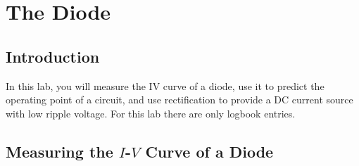 \chapter{The Diode}

%

\section{Introduction}

In this lab, you will measure the IV curve of a diode, use it to
predict the operating point of a circuit, and use rectification to
provide a DC current source with low ripple voltage. For this lab there are only logbook entries. 

\section{Measuring the $I$-$V$ Curve of a Diode}

